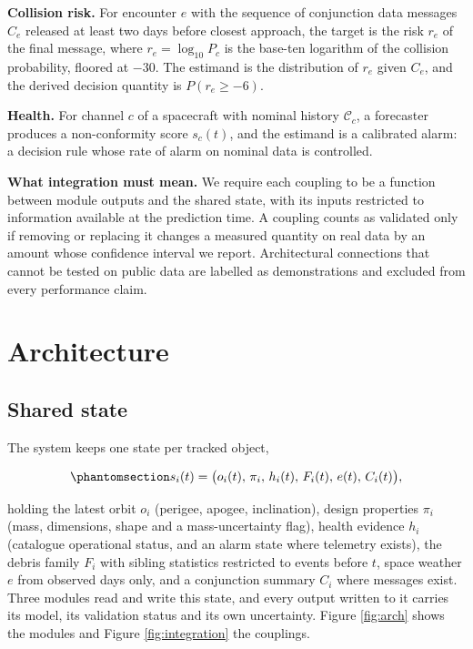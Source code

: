 \documentclass[3p,times]{elsarticle}
\begin{document}
\textbf{Collision risk.} For encounter \(e\) with the sequence of
conjunction data messages \(C_e\) released at least two days before
closest approach, the target is the risk \(r_e\) of the final message,
where \(r_e = \log_{10} P_c\) is the base-ten logarithm of the collision
probability, floored at \(-30\). The estimand is the distribution of
\(r_e\) given \(C_e\), and the derived decision quantity is
\(P(r_e \geq -6)\).

\textbf{Health.} For channel \(c\) of a spacecraft with nominal history
\(\mathcal{C}_c\), a forecaster produces a non-conformity score
\(s_c(t)\), and the estimand is a calibrated alarm: a decision rule
whose rate of alarm on nominal data is controlled.

\textbf{What integration must mean.} We require each coupling to be a
function between module outputs and the shared state, with its inputs
restricted to information available at the prediction time. A coupling
counts as validated only if removing or replacing it changes a measured
quantity on real data by an amount whose confidence interval we report.
Architectural connections that cannot be tested on public data are
labelled as demonstrations and excluded from every performance claim.

\section{Architecture}\label{sec:arch}

\subsection{Shared state}\label{shared-state}

The system keeps one state per tracked object,

\begin{equation}\protect\phantomsection\label{eq:state}{s_i(t) = \bigl(o_i(t),\, \pi_i,\, h_i(t),\, F_i(t),\, e(t),\, C_i(t)\bigr),}\end{equation}

holding the latest orbit \(o_i\) (perigee, apogee, inclination), design
properties \(\pi_i\) (mass, dimensions, shape and a mass-uncertainty
flag), health evidence \(h_i\) (catalogue operational status, and an
alarm state where telemetry exists), the debris family \(F_i\) with
sibling statistics restricted to events before \(t\), space weather
\(e\) from observed days only, and a conjunction summary \(C_i\) where
messages exist. Three modules read and write this state, and every
output written to it carries its model, its validation status and its
own uncertainty. Figure \ref{fig:arch} shows the modules and Figure
\ref{fig:integration} the couplings.
\end{document}

